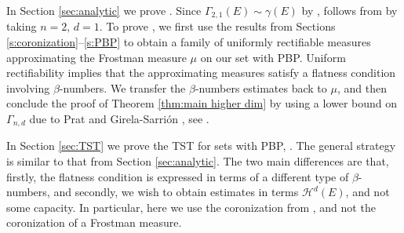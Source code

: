\documentclass[11pt,reqno]{amsart}
\theoremstyle{definition}
\theoremstyle{remark}
\numberwithin{equation}{section}
\DeclareMathOperator{\supp}{supp}
\theoremstyle{theorem}
\theoremstyle{definition}
\theoremstyle{remark}
\numberwithin{equation}{section}
\begin{document}
	In Section \ref{sec:analytic} we prove . Since $\Gamma_{2,1}(E)\sim\gamma(E)$ by \cite{tolsa2003painleve},  follows from  by taking $n=2,\, d=1$. 	
	To prove , we first use the results from Sections \ref{s:coronization}--\ref{s:PBP} to obtain a family of uniformly rectifiable measures approximating the Frostman measure $\mu$ on our set with PBP. Uniform rectifiability implies that the approximating measures satisfy a flatness condition involving $\beta$-numbers. We transfer the $\beta$-numbers estimates back to $\mu$, and then conclude the proof of Theorem \ref{thm:main higher dim} by using a lower bound on $\Gamma_{n,d}$ due to Prat \cite{prat2012semiadd} and Girela-Sarrión \cite{girela-sarrion2018}, see . %
	
	In Section \ref{sec:TST} we prove the TST for sets with PBP, . The general strategy is similar to that from Section \ref{sec:analytic}. The two main differences are that, firstly, the flatness condition is expressed in terms of a different type of $\beta$-numbers, and secondly, we wish to obtain estimates in terms $\mathcal{H}^d(E)$, and not some capacity. In particular, here we use the coronization from \cite{azzam2019quantitative}, and not the coronization of a Frostman measure.
	
\end{document}
